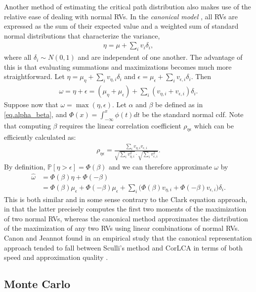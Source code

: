 \documentclass[12pt]{article}
\def\P{\mathbb{P}}
\begin{document}
Another method of estimating the critical path distribution also makes use of the relative ease of dealing with normal RVs. In the {\em canonical model} \cite{vis06,zha06}, all RVs are expressed as the sum of their expected value and a weighted sum of standard normal distributions that characterize the variance, 
\begin{align*}
\eta = \mu + \sum_i v_i \delta_i,
\end{align*}  
where all $\delta_i \sim N(0, 1)$ and are independent of one another. The advantage of this is that evaluating summations and maximizations becomes much more straightforward. Let $\eta = \mu_\eta + \sum_i v_{\eta, i} \delta_i$ and $\epsilon = \mu_\epsilon + \sum_i v_{\epsilon, i} \delta_i$. Then 
\begin{align*}
\omega = \eta + \epsilon = (\mu_\eta + \mu_\epsilon) + \sum_i (v_{\eta, i} + v_{\epsilon, i}) \delta_i.
\end{align*}
Suppose now that $\omega = \max(\eta, \epsilon)$. Let $\alpha$ and $\beta$ be defined as in \eqref{eq.alpha_beta}, and $\Phi(x) = \int_{-\infty}^{x} \phi(t) dt$ be the standard normal cdf. Note that computing $\beta$ requires the linear correlation coefficient $\rho_{\eta\epsilon}$ which can be efficiently calculated as:
\begin{align*}
\rho_{\eta\epsilon} = \frac{\sum_i v_{\eta, i} v_{\epsilon, i}}{\sqrt{\sum_i v_{\eta, i}^2} \cdot \sqrt{\sum_i v_{\epsilon, i}^2} }.
\end{align*}
By definition, $\P[\eta > \epsilon] = \Phi(\beta)$ and we can therefore approximate $\omega$ by 
\begin{align*}
\hat{\omega} &= \Phi(\beta)\eta + \Phi(-\beta) \\
&= \Phi(\beta) \mu_\epsilon + \Phi(-\beta) \mu_\epsilon + \sum_i \big( \Phi(\beta) v_{\eta, i} + \Phi(-\beta) v_{\epsilon, i} \big) \delta_i.
\end{align*}
This is both similar and in some sense contrary to the Clark equation approach, in that the latter precisely computes the first two moments of the maximization of two normal RVs, whereas the canonical method approximates the distribution of the maximization of any two RVs using linear combinations of normal RVs. Canon and Jeannot found in an empirical study that the canonical representation approach tended to fall between Sculli's method and CorLCA in terms of both speed and approximation quality \cite{can16}. 

\subsection{Monte Carlo}
\label{subsect.stochastic_monte_carlo}
\end{document}
